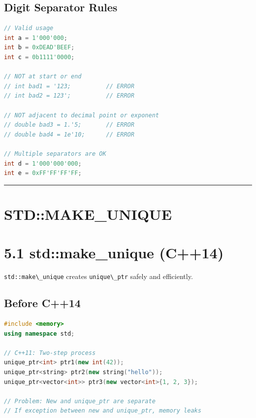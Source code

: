 \hypertarget{digit-separator-rules}{%
\subsection{Digit Separator Rules}\label{digit-separator-rules}}

\begin{lstlisting}[language={C++}]
// Valid usage
int a = 1'000'000;
int b = 0xDEAD'BEEF;
int c = 0b1111'0000;

// NOT at start or end
// int bad1 = '123;          // ERROR
// int bad2 = 123';          // ERROR

// NOT adjacent to decimal point or exponent
// double bad3 = 1.'5;       // ERROR
// double bad4 = 1e'10;      // ERROR

// Multiple separators are OK
int d = 1'000'000'000;
int e = 0xFF'FF'FF'FF;
\end{lstlisting}

\begin{center}\rule{0.5\linewidth}{0.5pt}\end{center}

\hypertarget{stdmake_unique}{%
\section{STD::MAKE\_UNIQUE}\label{stdmake_unique}}

\hypertarget{stdmake_unique-c14}{%
\section{5.1 std::make\_unique (C++14)}\label{stdmake_unique-c14}}

\passthrough{\lstinline!std::make\_unique!} creates
\passthrough{\lstinline!unique\_ptr!} safely and efficiently.

\hypertarget{before-c14}{%
\subsection{Before C++14}\label{before-c14}}

\begin{lstlisting}[language={C++}]
#include <memory>
using namespace std;

// C++11: Two-step process
unique_ptr<int> ptr1(new int(42));
unique_ptr<string> ptr2(new string("hello"));
unique_ptr<vector<int>> ptr3(new vector<int>{1, 2, 3});

// Problem: New and unique_ptr are separate
// If exception between new and unique_ptr, memory leaks
\end{lstlisting}


